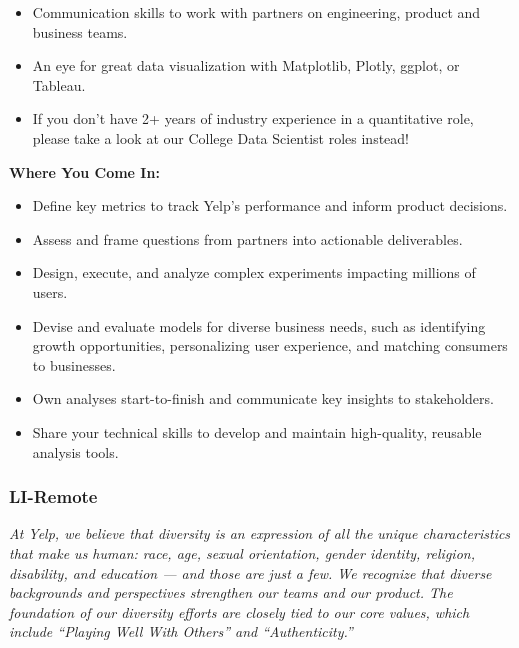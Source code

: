 \documentclass[
  openany]{book}
\providecommand{\tightlist}{%
  \setlength{\itemsep}{0pt}\setlength{\parskip}{0pt}}
\begin{document}
\begin{itemize}
\item
  Communication skills to work with partners on engineering, product and business teams.
\item
  An eye for great data visualization with Matplotlib, Plotly, ggplot, or Tableau.
\item
  If you don't have 2+ years of industry experience in a quantitative role, please take a look at our College Data Scientist roles instead!
\end{itemize}

\textbf{Where You Come In:}

\begin{itemize}
\tightlist
\item
  Define key metrics to track Yelp's performance and inform product decisions.
\end{itemize}

\begin{itemize}
\item
  Assess and frame questions from partners into actionable deliverables.
\item
  Design, execute, and analyze complex experiments impacting millions of users.
\item
  Devise and evaluate models for diverse business needs, such as identifying growth opportunities, personalizing user experience, and matching consumers to businesses.
\item
  Own analyses start-to-finish and communicate key insights to stakeholders.
\item
  Share your technical skills to develop and maintain high-quality, reusable analysis tools.
\end{itemize}

\hypertarget{li-remote}{%
\subsubsection{LI-Remote}\label{li-remote}}

\emph{At Yelp, we believe that diversity is an expression of all the unique characteristics that make us human: race, age, sexual orientation, gender identity, religion, disability, and education --- and those are just a few. We recognize that diverse backgrounds and perspectives strengthen our teams and our product. The foundation of our diversity efforts are closely tied to our core values, which include ``Playing Well With Others'' and ``Authenticity.''}
\end{document}
